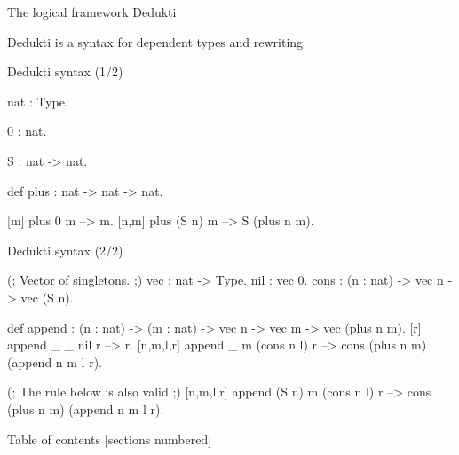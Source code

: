 \documentclass[usenames, dvipsnames]{beamer}
\newcommand{\orange}[1]{\textcolor{BurntOrange}{#1}}
\newcommand{\blue}[1]{\textcolor{NavyBlue}{#1}}
\begin{document}
\begin{frame}{The logical framework Dedukti}
    \begin{center}
    \end{center}

  \begin{center}
    Dedukti is a \orange{syntax} for \blue{dependent types} and \blue{rewriting}
  \end{center}
\end{frame}

\begin{frame}[fragile]{Dedukti syntax (1/2)}
  \begin{dedukti}
nat : Type.

0 : nat.

S : nat -> nat.

def plus : nat -> nat -> nat.

[m]   plus 0     m --> m.
[n,m] plus (S n) m --> S (plus n m).
\end{dedukti}
\end{frame}

\begin{frame}[fragile]{Dedukti syntax (2/2)}
  \begin{dedukti}
(; Vector of singletons. ;)
vec : nat -> Type.
nil : vec 0.
cons : (n : nat) -> vec n -> vec (S n).

def append : (n : nat) -> (m : nat) -> vec n -> vec m -> vec (plus n m).
[r]       append _ _ nil r        --> r.
[n,m,l,r] append _ m (cons n l) r --> cons (plus n m) (append n m l r).

(; The rule below is also valid ;)
[n,m,l,r] append (S n) m (cons n l) r --> cons (plus n m) (append n m l r).
\end{dedukti}
\end{frame}




\begin{frame}{Table of contents}
  [sections numbered]
  \tableofcontents[hideallsubsections]
\end{frame}
\end{document}
